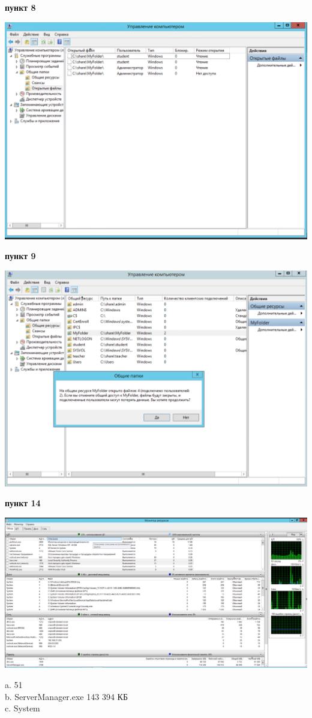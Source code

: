 \documentclass[a4paper,14pt]{extarticle}
\begin{document}
    \textbf{пункт 8}
    \begin{center}
        \includegraphics[scale=0.6]{8.png}
    \end{center}

    \newpage
    \textbf{пункт 9}
    \begin{center}
        \includegraphics[scale=0.6]{9.png}
    \end{center}

    \textbf{пункт 14}
    \begin{center}
        \includegraphics[scale=0.4]{14.png}
    \end{center}
    a. 51\\
    b. ServerManager.exe 143 394 КБ\\
    c. System\\
\end{document}
